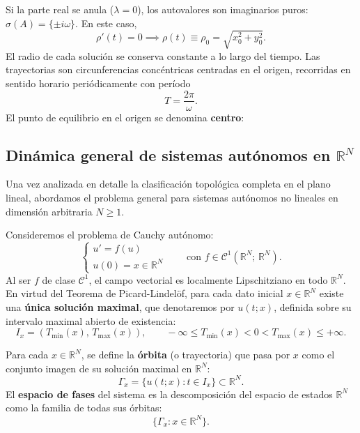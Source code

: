 Si la parte real se anula ($\lambda = 0$), los autovalores son imaginarios puros: $\sigma(A) = \{ \pm i \omega \}$. En este caso,
\[
    \rho'(t) = 0 \implies \rho(t) \equiv \rho_0 = \sqrt{x_0^2 + y_0^2}.
\]
El radio de cada solución se conserva constante a lo largo del tiempo. Las trayectorias son circunferencias concéntricas centradas en el origen, recorridas en sentido horario periódicamente con período
\[
    T = \frac{2\pi}{\omega}.
\]
El punto de equilibrio en el origen se denomina \textbf{centro}:
\begin{center}
\end{center}

\subsection{Dinámica general de sistemas autónomos en $\mathbb{R}^N$}

Una vez analizada en detalle la clasificación topológica completa en el plano lineal, abordamos el problema general para sistemas autónomos no lineales en dimensión arbitraria $N \geq 1$.

Consideremos el problema de Cauchy autónomo:
\[
    \begin{cases}
        u' = f(u) \\
        u(0) = x \in \mathbb{R}^N
    \end{cases}
    \qquad \text{con } f \in \mathcal{C}^1(\mathbb{R}^N; \, \mathbb{R}^N).
\]
Al ser $f$ de clase $\mathcal{C}^1$, el campo vectorial es localmente Lipschitziano en todo $\mathbb{R}^N$. En virtud del Teorema de Picard-Lindelöf, para cada dato inicial $x \in \mathbb{R}^N$ existe una \textbf{única solución maximal}, que denotaremos por $u(t; x)$, definida sobre su intervalo maximal abierto de existencia:
\[
    I_x = (T_{\min}(x), \, T_{\max}(x)), \qquad -\infty \leq T_{\min}(x) < 0 < T_{\max}(x) \leq +\infty.
\]

\begin{definición}
    Para cada $x \in \mathbb{R}^N$, se define la \textbf{órbita} (o trayectoria) que pasa por $x$ como el conjunto imagen de su solución maximal en $\mathbb{R}^N$:
    \[
        \Gamma_x = \{ u(t; x) : t \in I_x \} \subset \mathbb{R}^N.
    \]
    El \textbf{espacio de fases} del sistema es la descomposición del espacio de estados $\mathbb{R}^N$ como la familia de todas sus órbitas:
    \[
        \{ \Gamma_x : x \in \mathbb{R}^N \}.
    \]
\end{definición}

